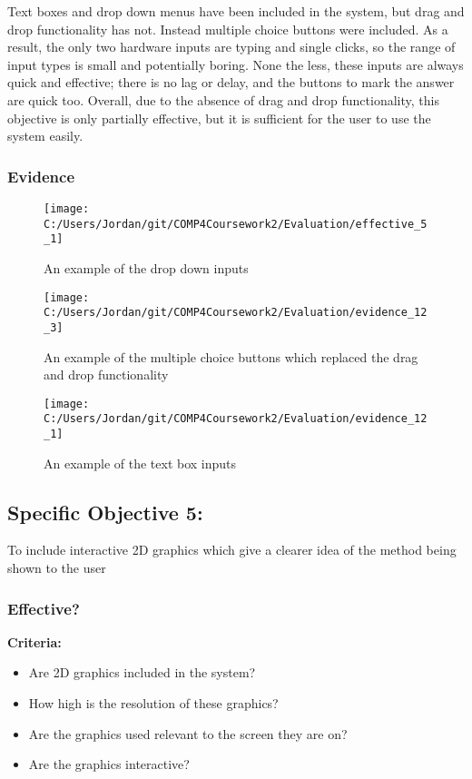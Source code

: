 Text boxes and drop down menus have been included in the system, but drag and drop functionality has not. Instead multiple choice buttons were included. As a result, the only two hardware inputs are typing and single clicks, so the range of input types is small and potentially boring. None the less, these inputs are always quick and effective; there is no lag or delay, and the buttons to mark the answer are quick too. Overall, due to the absence of drag and drop functionality, this objective is only partially effective, but it is sufficient for the user to use the system easily.

\subsubsection{Evidence}

\begin{figure}[H]
	\texttt{[image: C:/Users/Jordan/git/COMP4Coursework2/Evaluation/effective\_5\_1]}
	\caption{An example of the drop down inputs}
\end{figure}

\begin{figure}[H]
	\texttt{[image: C:/Users/Jordan/git/COMP4Coursework2/Evaluation/evidence\_12\_3]}
	\caption{An example of the multiple choice buttons which replaced the drag and drop functionality}
\end{figure}

\begin{figure}[H]
	\texttt{[image: C:/Users/Jordan/git/COMP4Coursework2/Evaluation/evidence\_12\_1]}
	\caption{An example of the text box inputs}
\end{figure}

\subsection{Specific Objective 5: }

To include interactive 2D graphics which give a clearer idea of the method being shown to the user

\subsubsection{Effective?}

\textbf{Criteria: }
	
\begin{itemize}
	\item Are 2D graphics included in the system?
	\item How high is the resolution of these graphics?
	\item Are the graphics used relevant to the screen they are on?
	\item Are the graphics interactive?
\end{itemize}

